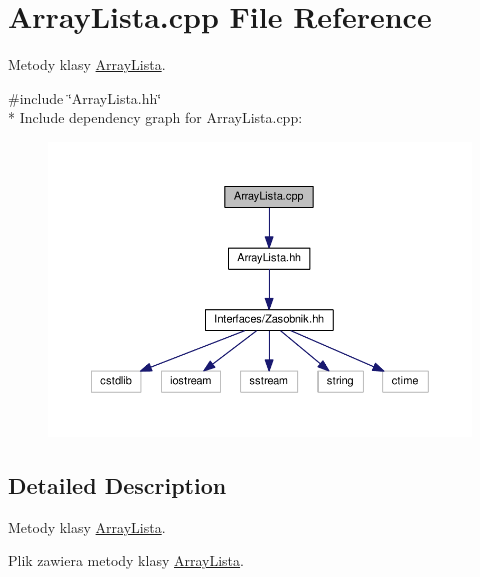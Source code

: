 \hypertarget{a00033}{}\section{Array\+Lista.\+cpp File Reference}
\label{a00033}


Metody klasy \hyperlink{a00008}{Array\+Lista}.  


{\ttfamily \#include \char`\"{}Array\+Lista.\+hh\char`\"{}}\\*
Include dependency graph for Array\+Lista.\+cpp\+:
\nopagebreak
\begin{figure}[H]
\begin{center}
\leavevmode
\includegraphics[width=350pt]{a00080}
\end{center}
\end{figure}


\subsection{Detailed Description}
Metody klasy \hyperlink{a00008}{Array\+Lista}. 

Plik zawiera metody klasy \hyperlink{a00008}{Array\+Lista}. 